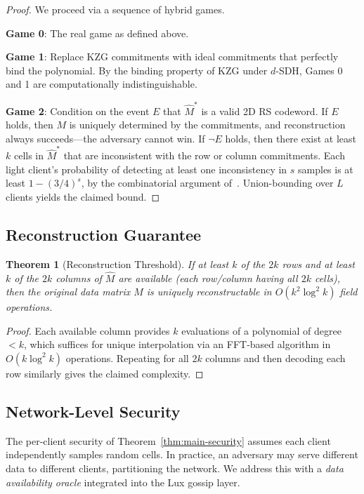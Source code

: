 \documentclass[11pt,a4paper]{article}
\theoremstyle{plain}
\newtheorem{theorem}{Theorem}[section]
\theoremstyle{definition}
\theoremstyle{remark}
\begin{document}
\begin{proof}
We proceed via a sequence of hybrid games.

\textbf{Game 0}: The real game as defined above.

\textbf{Game 1}: Replace KZG commitments with ideal commitments that perfectly bind the
polynomial. By the binding property of KZG under $d$-SDH, Games 0 and 1 are
computationally indistinguishable.

\textbf{Game 2}: Condition on the event $E$ that $\hat{M}^*$ is a valid 2D RS codeword.
If $E$ holds, then $M$ is uniquely determined by the commitments, and reconstruction always
succeeds---the adversary cannot win. If $\neg E$ holds, then there exist at least $k$ cells
in $\hat{M}^*$ that are inconsistent with the row or column commitments. Each light client's
probability of detecting at least one inconsistency in $s$ samples is at least
$1 - (3/4)^s$, by the combinatorial argument of~\cite{albassam2018fraud}. Union-bounding
over $L$ clients yields the claimed bound.
\end{proof}

\subsection{Reconstruction Guarantee}

\begin{theorem}[Reconstruction Threshold]
\label{thm:reconstruction}
If at least $k$ of the $2k$ rows and at least $k$ of the $2k$ columns of $\hat{M}$ are
available (each row/column having all $2k$ cells), then the original data matrix $M$ is
uniquely reconstructable in $O(k^2 \log^2 k)$ field operations.
\end{theorem}

\begin{proof}
Each available column provides $k$ evaluations of a polynomial of degree $< k$, which
suffices for unique interpolation via an FFT-based algorithm in $O(k \log^2 k)$ operations.
Repeating for all $2k$ columns and then decoding each row similarly gives the claimed
complexity.
\end{proof}

\subsection{Network-Level Security}

The per-client security of Theorem~\ref{thm:main-security} assumes each client independently
samples random cells. In practice, an adversary may serve different data to different clients,
partitioning the network. We address this with a \emph{data availability oracle} integrated
into the Lux gossip layer.
\end{document}
